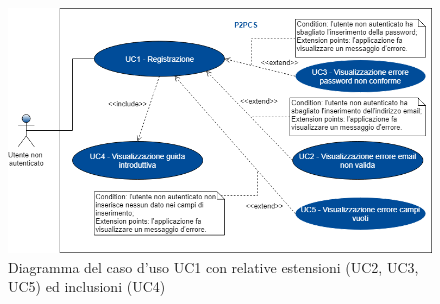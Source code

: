 \begin{figure}[h]
	\includegraphics[width=15cm]{res/images/Schemagenerale1.png}
	\centering
	\caption{Diagramma del caso d'uso UC1 con relative estensioni (UC2, UC3, UC5) ed inclusioni (UC4)}
\end{figure}
